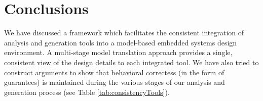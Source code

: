 \section{Conclusions}

We have discussed a framework which facilitates the consistent integration of analysis and generation tools into a model-based embedded systems design environment.  A multi-stage model translation approach provides a single, consistent view of the design details to each integrated tool.  We have also tried to construct arguments to show that behavioral correctess (in the form of guarantees) is maintained during the various stages of our analysis and generation process (see Table  \ref{tab:consistencyTools}).


